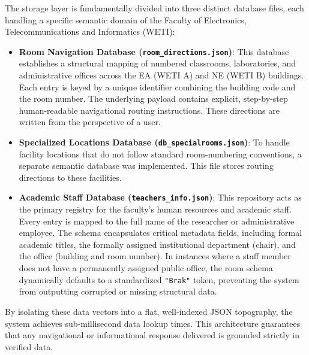 \documentclass{article}
\begin{document}
The storage layer is fundamentally divided into three distinct database files, each handling a specific semantic domain of the Faculty of Electronics, Telecommunications and Informatics (WETI):

\begin{itemize}
    \item \textbf{Room Navigation Database (\texttt{room\_directions.json})}: 
    This database establishes a structural mapping of numbered classrooms, laboratories, and administrative offices across the EA (WETI A) and NE (WETI B) buildings. Each entry is keyed by a unique identifier combining the building code and the room number. The underlying payload contains explicit, step-by-step human-readable navigational routing instructions. These directions are written from the perspective of a user.
    
    \item \textbf{Specialized Locations Database (\texttt{db\_specialrooms.json})}: 
    To handle facility locations that do not follow standard room-numbering conventions, a separate semantic database was implemented. This file stores routing directions to these facilities.
    
    \item \textbf{Academic Staff Database (\texttt{teachers\_info.json})}: 
    This repository acts as the primary registry for the faculty's human resources and academic staff. Every entry is mapped to the full name of the researcher or administrative employee. The schema encapsulates critical metadata fields, including formal academic titles, the formally assigned institutional department (chair), and the office (building and room number). In instances where a staff member does not have a permanently assigned public office, the room schema dynamically defaults to a standardized \texttt{"Brak"} token, preventing the system from outputting corrupted or missing structural data.
\end{itemize}

By isolating these data vectors into a flat, well-indexed JSON topography, the system achieves sub-millisecond data lookup times. This architecture guarantees that any navigational or informational response delivered is grounded strictly in verified data.
	
\end{document}
